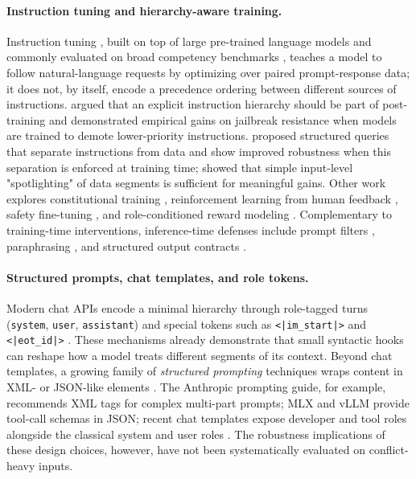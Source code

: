 \documentclass[11pt,twocolumn]{article}
\begin{document}
\paragraph{Instruction tuning and hierarchy-aware training.}
Instruction tuning \cite{ouyang2022training, wei2022finetuned, chung2024scaling, sanh2022multitask, longpre2023flan}, built on top of large pre-trained language models \cite{brown2020gpt3, raffel2020t5} and commonly evaluated on broad competency benchmarks \cite{hendrycks2021mmlu}, teaches a model to follow natural-language requests by optimizing over paired prompt-response data; it does not, by itself, encode a precedence ordering between different sources of instructions. \citet{wallace2024instructionhierarchy} argued that an explicit instruction hierarchy should be part of post-training and demonstrated empirical gains on jailbreak resistance when models are trained to demote lower-priority instructions. \citet{chen2024struq} proposed structured queries that separate instructions from data and show improved robustness when this separation is enforced at training time; \citet{yi2024spotlighting} showed that simple input-level "spotlighting" of data segments is sufficient for meaningful gains. Other work explores constitutional training \cite{bai2022constitutional, lee2023rlaif, rastogi2024constitutional}, reinforcement learning from human feedback \cite{christiano2017deeprlhf}, safety fine-tuning \cite{touvron2023llama, dubey2024llama3, achiam2023gpt4}, and role-conditioned reward modeling \cite{kundu2023specific, carlini2024aligned}. Complementary to training-time interventions, inference-time defenses include prompt filters \cite{jain2023baseline}, paraphrasing \cite{ji2024defending}, and structured output contracts \cite{yao2023tree}.

\paragraph{Structured prompts, chat templates, and role tokens.}
Modern chat APIs encode a minimal hierarchy through role-tagged turns (\texttt{system}, \texttt{user}, \texttt{assistant}) and special tokens such as \texttt{<|im\_start|>} and \texttt{<|eot\_id|>} \cite{openai2024chatml, anthropic2024messages, meta2024llama3tmpl}. These mechanisms already demonstrate that small syntactic hooks can reshape how a model treats different segments of its context. Beyond chat templates, a growing family of \emph{structured prompting} techniques wraps content in XML- or JSON-like elements \cite{kojima2022zeroshot, wang2023selfconsistency, wei2022chain, anthropic2024xml}. The Anthropic prompting guide, for example, recommends XML tags for complex multi-part prompts; MLX and vLLM provide tool-call schemas in JSON; recent chat templates expose developer and tool roles alongside the classical system and user roles \cite{openai2024devmessages}. The robustness implications of these design choices, however, have not been systematically evaluated on conflict-heavy inputs.
\end{document}
